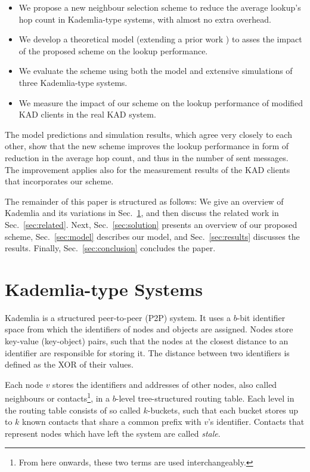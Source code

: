 \documentclass[10pt, conference, compsocconf, letterpaper]{IEEEtran}
\begin{document}
\begin{itemize}
\item We propose a new neighbour selection scheme to reduce the average lookup's hop count in Kademlia-type systems, with almost no extra overhead. 
\item We develop a theoretical model (extending a prior work \cite{roos13comprehending}) to asses the impact of the proposed scheme on the lookup performance.
\item We evaluate the scheme using both the model and extensive simulations of three Kademlia-type systems. 
\item We measure the impact of our scheme on the lookup performance of modified KAD clients in the real KAD system.
\end{itemize}
 
The model predictions and simulation results, which agree very closely to each other, show that the new scheme improves the lookup performance in form of reduction in the average hop count, and thus in the number of sent messages. 
The improvement applies also for the measurement results of the KAD clients that incorporates our scheme.

The remainder of this paper is structured as follows: We give an overview of Kademlia and its variations in Sec.~\ref{sec:kademlia}, and then discuss the related work in Sec.~\ref{sec:related}. Next, Sec.~\ref{sec:solution} presents an overview of our proposed scheme, Sec.~\ref{sec:model} describes our model, and Sec.~\ref{sec:results} discusses the results. Finally, Sec.~\ref{sec:conclusion} concludes the paper.



\section{Kademlia-type Systems} \label{sec:kademlia}

Kademlia \cite{Maymounkov02Kademlia} is a structured peer-to-peer (P2P) system. It uses a $b$-bit identifier space from which the identifiers of nodes and objects are assigned. Nodes store key-value (key-object) pairs, such that the nodes at the closest distance to an identifier are responsible for storing it. The distance between two identifiers is defined as the XOR of their values.  

Each node $v$ stores the identifiers and addresses of other nodes, also called neighbours or contacts\footnote{From here onwards, these two terms are used interchangeably.}, in a $b$-level tree-structured routing table. Each level in the routing table consists of so called $k$-buckets, such that each bucket stores up to $k$ known contacts that share a common prefix with $v$'s identifier. Contacts that represent nodes which have left the system are called \emph{stale}. 
\end{document}
